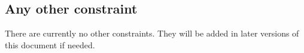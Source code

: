 \subsection{Any other constraint}

There are currently no other constraints. They will be added in later versions of this document if needed.